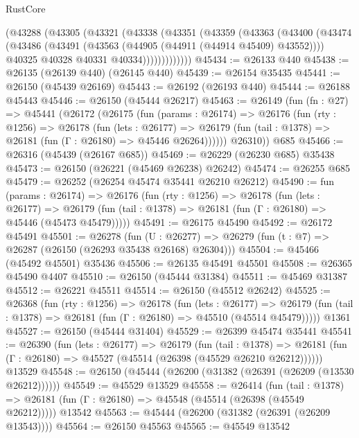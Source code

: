 \begin{lexlean}{RustCore}
\begin{coremodule}
          (@43288
            (@43305
              (@43321
                (@43338
                  (@43351
                    (@43359
                      (@43363
                        (@43400
                          (@43474
                            (@43486
                              (@43491 (@43563 (@44905 (@44911 (@44914 @45409) @43552))))
                              @40325
                              @40328
                              @40331
                              @40334)))))))))))))
@45434 := @26133 @440
@45438 := @26135 (@26139 @440) (@26145 @440)
@45439 := @26154 @35435
@45441 := @26150 (@45439 @26169)
@45443 := @26192 (@26193 @440)
@45444 := @26188 @45443
@45446 := @26150 (@45444 @26217)
@45463 := @26149
    (fun (fn : @27) =>
    @45441
      (@26172
        (@26175
          (fun (params : @26174) =>
          @26176
            (fun (rty : @1256) =>
            @26178
              (fun (lets : @26177) =>
              @26179 (fun (tail : @1378) => @26181 (fun (Γ : @26180) => @45446 @26264))))))
        @26310))
    @685
@45466 := @26316 (@45439 (@26167 @685))
@45469 := @26229 (@26230 @685) @35438
@45473 := @26150 (@26221 (@45469 @26238) @26242)
@45474 := @26255 @685
@45479 := @26252 (@26254 @45474 @35441 @26210 @26212)
@45490 := fun (params : @26174) =>
  @26176
    (fun (rty : @1256) =>
    @26178
      (fun (lets : @26177) =>
      @26179 (fun (tail : @1378) => @26181 (fun (Γ : @26180) => @45446 (@45473 @45479)))))
@45491 := @26175 @45490
@45492 := @26172 @45491
@45501 := @26278
    (fun (U : @26277) => @26279 (fun (t : @7) => @26287 (@26150 (@26293 @35438 @26168) @26304)))
@45504 := @45466 (@45492 @45501) @35436
@45506 := @26135 @45491 @45501
@45508 := @26365 @45490 @4407
@45510 := @26150 (@45444 @31384)
@45511 := @45469 @31387
@45512 := @26221 @45511
@45514 := @26150 (@45512 @26242)
@45525 := @26368
    (fun (rty : @1256) =>
    @26178
      (fun (lets : @26177) =>
      @26179 (fun (tail : @1378) => @26181 (fun (Γ : @26180) => @45510 (@45514 @45479)))))
    @1361
@45527 := @26150 (@45444 @31404)
@45529 := @26399 @45474 @35441
@45541 := @26390
    (fun (lets : @26177) =>
    @26179
      (fun (tail : @1378) =>
      @26181 (fun (Γ : @26180) => @45527 (@45514 (@26398 (@45529 @26210 @26212))))))
    @13529
@45548 := @26150 (@45444 (@26200 (@31382 (@26391 (@26209 (@13530 @26212))))))
@45549 := @45529 @13529
@45558 := @26414
    (fun (tail : @1378) => @26181 (fun (Γ : @26180) => @45548 (@45514 (@26398 (@45549 @26212)))))
    @13542
@45563 := @45444 (@26200 (@31382 (@26391 (@26209 @13543))))
@45564 := @26150 @45563
@45565 := @45549 @13542

\end{coremodule}
\end{lexlean}
